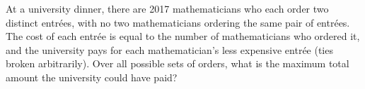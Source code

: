 At a university dinner, there are 2017 mathematicians who each order two distinct entr\'ees, with no two mathematicians ordering the same pair of entr\'ees. The cost of each entr\'ee is equal to the number of mathematicians who ordered it, and the university pays for each mathematician's less expensive entr\'ee (ties broken arbitrarily). Over all possible sets of orders, what is the maximum total amount the university could have paid?